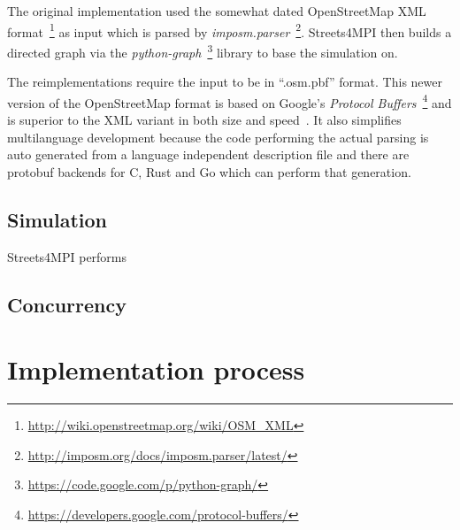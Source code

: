The original implementation used the somewhat dated OpenStreetMap XML format~\footnote{\url{http://wiki.openstreetmap.org/wiki/OSM_XML}} as input which is parsed by \textit{imposm.parser}~\footnote{\url{http://imposm.org/docs/imposm.parser/latest/}}. Streets4MPI then builds a directed graph via the \textit{python-graph}~\footnote{\url{https://code.google.com/p/python-graph/}} library to base the simulation on.\cite{streets_report}

The reimplementations require the input to be in ``.osm.pbf'' format. This newer version of the OpenStreetMap format is based on Google's \textit{Protocol Buffers}~\footnote{\url{https://developers.google.com/protocol-buffers/}} and is superior to the XML variant in both size and speed~\cite{osm_wiki_pbf}. It also simplifies multilanguage development because the code performing the actual parsing is auto generated from a language independent description file and there are protobuf backends for C, Rust and Go which can perform that generation.

\subsection*{Simulation}
\label{subsec:Approach::Differences::Simulation}

Streets4MPI performs 

\subsection*{Concurrency}
\label{subsec:Approach::Differences::Concurrency}


\section{Implementation process}
\label{sec:Approach::Implementation}
